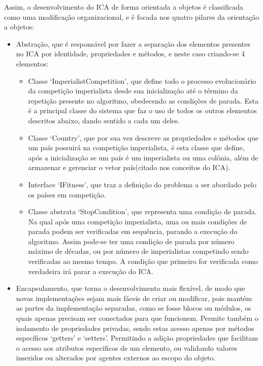 Assim, o desenvolvimento do ICA de forma orientada a objetos é classificada como uma modificação organizacional, e é focada nos quatro pilares da orientação a objetos:
\begin{itemize}
\item Abstração, que é responsável por fazer a separação dos elementos presentes no ICA por identidade, propriedades e métodos, e neste caso criando-se 4 elementos:

\begin{itemize}
\item Classe ‘ImperialistCompetition’, que define todo o processo evolucionário da competição imperialista desde sua inicialização até o término da repetição presente no algoritmo, obedecendo as condições de parada. Esta é a principal classe do sistema que faz o uso de todos os outros elementos descritos abaixo, dando sentido a cada um deles.
\item Classe ‘Country’, que por sua vez descreve as propriedades e métodos que um país possuirá na competição imperialista, é esta classe que define, após a inicialização se um país é um imperialista ou uma colônia, além de armazenar e gerenciar o vetor país(citado nos conceitos do ICA).
\item Interface ‘IFitness’, que traz a definição do problema a ser abordado pelo os países em competição.
\item  Classe abstrata ‘StopCondition’, que representa uma condição de parada. Na qual após uma competição imperialista, uma ou mais condições de parada podem ser verificadas em sequência, parando a execução do algoritmo. Assim pode-se ter uma condição de parada por número máximo de décadas, ou por número de imperialistas competindo sendo verificadas ao mesmo tempo. A condição que primeiro for verificada como verdadeira irá parar a execução do ICA.
\end{itemize}
 
\item Encapsulamento, que torna o desenvolvimento mais flexível, de modo que novas implementações sejam mais fáceis de criar ou modificar, pois mantém as partes da implementação separadas, como se fosse blocos ou módulos, os quais apenas precisam ser conectados para que funcionem. 
Permite também o isolamento de propriedades privadas, sendo estas acesso apenas por métodos específicos ‘getters’ e ‘setters’. Permitindo a adição propriedades que facilitam o acesso aos atributos específicos de um elemento, ou validando valores inseridos ou alterados por agentes externos ao escopo do objeto.


\end{itemize}
